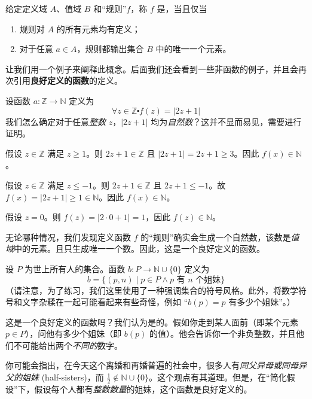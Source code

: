 \begin{definition}\label{def:definition7.2.5}
    给定定义域 $A$、值域 $B$ 和``规则''$f$，称 $f$ 是，当且仅当
    \begin{enumerate}[label=(\arabic*)]
        \item 规则对 $A$ 的所有元素均有定义；
        \item 对于任意 $a \in A$，规则都输出集合 $B$ 中的唯一一个元素。
    \end{enumerate}
\end{definition}

让我们用一个例子来阐释此概念。后面我们还会看到一些非函数的例子，并且会再次引用\textbf{良好定义的函数}的定义。

\begin{example}
    设函数 $a : \mathbb{Z} \to \mathbb{N}$ 定义为
    \[\forall z \in \mathbb{Z} \centerdot f(z) = |2z + 1|\]
    我们怎么确定对于任意\emph{整数} $z$，$|2z + 1|$ 均为\emph{自然数}？这并不显而易见，需要进行证明。

    假设 $z \in \mathbb{Z}$ 满足 $z \ge 1$。则 $2z+1 \in \mathbb{Z}$ 且 $|2z+1| = 2z+1 \ge 3$。因此 $f(x) \in \mathbb{N}$。

    假设 $z \in \mathbb{Z}$ 满足 $z \le -1$。则 $2z+1 \in \mathbb{Z}$ 且 $2z+1 \le -1$。故 $f(x) = |2z + 1| \ge 1 \in \mathbb{N}$。因此 $f(x) \in \mathbb{N}$。

    假设 $z = 0$。则 $f(z) = |2 \cdot 0 + 1| = 1$，因此 $f(z) \in \mathbb{N}$。

    无论哪种情况，我们发现定义函数 $f$ 的``规则''确实会生成一个自然数，该数是\emph{值域}中的元素。且只生成唯一一个数。因此，这是一个良好定义的函数。
\end{example}

\begin{example}
    设 $P$ 为世上所有人的集合。函数 $b : P \to \mathbb{N} \cup \{0\}$ 定义为
    \[b = \{(p, n) \mid p \in P \land p \text{\ 有\ } n \text{\ 个姐妹}\}\]
    （请注意，为了练习，我们这里使用了一种强调集合的符号风格。此外，将数学符号和文字杂糅在一起可能看起来有些奇怪，例如 ``$b(p) = p \text{\ 有多少个姐妹}$''。）

    这是一个良好定义的函数吗？我们认为是的。假如你走到某人面前（即某个元素 $p \in P$），问他有多少个姐妹（即 $b(p)$ 的值）。他会告诉你一个非负整数，并且他们不可能给出两个\emph{不同的}数字。

    你可能会指出，在今天这个离婚和再婚普遍的社会中，很多人有\emph{同父异母或同母异父的姐妹} (half-sisters)，而 $\frac{1}{2} \notin \mathbb{N} \cup \{0\}$。这个观点有其道理。但是，在``简化假设''下，假设每个人都有\emph{整数数量}的姐妹，这个函数是良好定义的。
\end{example}

